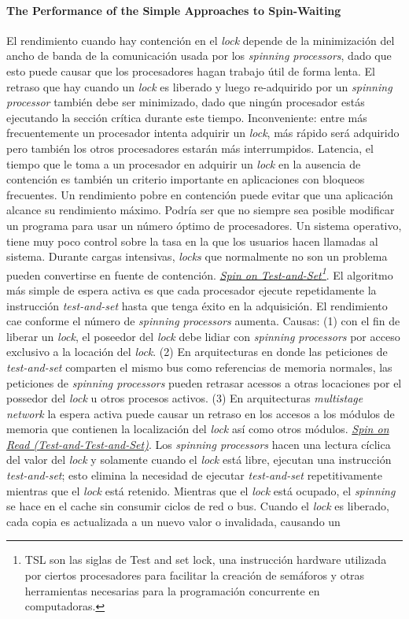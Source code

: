 \paragraph{\textnormal{\textbf{The Performance of the Simple Approaches to Spin-Waiting}}}
El rendimiento cuando hay contención en el \textit{lock} depende de la minimización del ancho de banda de la comunicación usada por los \textit{spinning processors}, dado que esto puede causar que los procesadores hagan trabajo útil de forma lenta. El retraso que hay cuando un \textit{lock} es liberado y luego re-adquirido por un \textit{spinning processor} también debe ser minimizado, dado que ningún procesador estás ejecutando la sección crítica durante este tiempo. Inconveniente: entre más frecuentemente un procesador intenta adquirir un \textit{lock}, más rápido será adquirido pero también los otros procesadores estarán más interrumpidos. Latencia, el tiempo que le toma a un procesador en adquirir un \textit{lock} en la ausencia de contención es también un criterio importante en aplicaciones con bloqueos frecuentes. Un rendimiento pobre en contención puede evitar que una aplicación alcance su rendimiento máximo. Podría ser que no siempre sea posible modificar un programa para usar un número óptimo de procesadores. Un sistema operativo, tiene muy poco control sobre la tasa en la que los usuarios hacen llamadas al sistema. Durante cargas intensivas, \textit{locks} que normalmente no son un problema pueden convertirse en fuente de contención. \underline{\textit{Spin on Test-and-Set\footnote{TSL son las siglas de Test and set lock, una instrucción hardware utilizada por ciertos procesadores para facilitar la creación de semáforos y otras herramientas necesarias para la programación concurrente en computadoras.}}}. El algoritmo más simple de espera activa es que cada procesador ejecute repetidamente la instrucción \textit{test-and-set} hasta que tenga éxito en la adquisición. El rendimiento cae conforme el número de \textit{spinning processors} aumenta. Causas: (1) con el fin de liberar un \textit{lock}, el poseedor del \textit{lock} debe lidiar con \textit{spinning processors} por acceso exclusivo a la locación del \textit{lock}. (2) En arquitecturas en donde las peticiones de \textit{test-and-set} comparten el mismo bus como referencias de memoria normales, las peticiones de \textit{spinning processors} pueden retrasar acessos a otras locaciones por el possedor del \textit{lock} u otros procesos activos. (3) En arquitecturas \textit{multistage network} la espera activa puede causar un retraso en los accesos a los módulos de memoria que contienen la localización del \textit{lock} así como otros módulos. \underline{\textit{Spin on Read (Test-and-Test-and-Set)}}. Los \textit{spinning processors} hacen una lectura cíclica del valor del \textit{lock} y solamente cuando el \textit{lock} está libre, ejecutan una instrucción \textit{test-and-set}; esto elimina la necesidad de ejecutar \textit{test-and-set} repetitivamente mientras que el \textit{lock} está retenido. Mientras que el \textit{lock} está ocupado, el \textit{spinning} se hace en el cache sin consumir ciclos de red o bus. Cuando el \textit{lock} es liberado, cada copia es actualizada a un nuevo valor o invalidada, causando un 